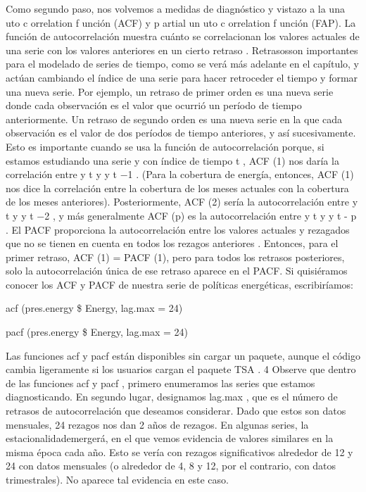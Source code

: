\documentclass[
]{book}
\begin{document}
Como segundo paso, nos volvemos a medidas de diagnóstico y vistazo a la una uto c orrelation f unción (ACF) y p artial un uto c orrelation f unción (FAP). La función de autocorrelación muestra cuánto se correlacionan los valores actuales de una serie con los valores anteriores en un cierto retraso . Retrasosson importantes para el modelado de series de tiempo, como se verá más adelante en el capítulo, y actúan cambiando el índice de una serie para hacer retroceder el tiempo y formar una nueva serie. Por ejemplo, un retraso de primer orden es una nueva serie donde cada observación es el valor que ocurrió un período de tiempo anteriormente. Un retraso de segundo orden es una nueva serie en la que cada observación es el valor de dos períodos de tiempo anteriores, y así sucesivamente. Esto es importante cuando se usa la función de autocorrelación porque, si estamos estudiando una serie y con índice de tiempo t , ACF (1) nos daría la correlación entre y t y y t −1 . (Para la cobertura de energía, entonces, ACF (1) nos dice la correlación entre la cobertura de los meses actuales con la cobertura de los meses anteriores). Posteriormente, ACF (2) sería la autocorrelación entre y t y y t −2 , y más generalmente ACF (p) es la autocorrelación entre y t y y t - p . El PACF proporciona la autocorrelación entre los valores actuales y rezagados que no se tienen en cuenta en todos los rezagos anteriores . Entonces, para el primer retraso, ACF (1) = PACF (1), pero para todos los retrasos posteriores, solo la autocorrelación única de ese retraso aparece en el PACF. Si quisiéramos conocer los ACF y PACF de nuestra serie de políticas energéticas, escribiríamos:

acf (pres.energy \$ Energy, lag.max = 24)

pacf (pres.energy \$ Energy, lag.max = 24)

Las funciones acf y pacf están disponibles sin cargar un paquete, aunque el código cambia ligeramente si los usuarios cargan el paquete TSA . 4 Observe que dentro de las funciones acf y pacf , primero enumeramos las series que estamos diagnosticando. En segundo lugar, designamos lag.max , que es el número de retrasos de autocorrelación que deseamos considerar. Dado que estos son datos mensuales, 24 rezagos nos dan 2 años de rezagos. En algunas series, la estacionalidademergerá, en el que vemos evidencia de valores similares en la misma época cada año. Esto se vería con rezagos significativos alrededor de 12 y 24 con datos mensuales (o alrededor de 4, 8 y 12, por el contrario, con datos trimestrales). No aparece tal evidencia en este caso.
\end{document}
